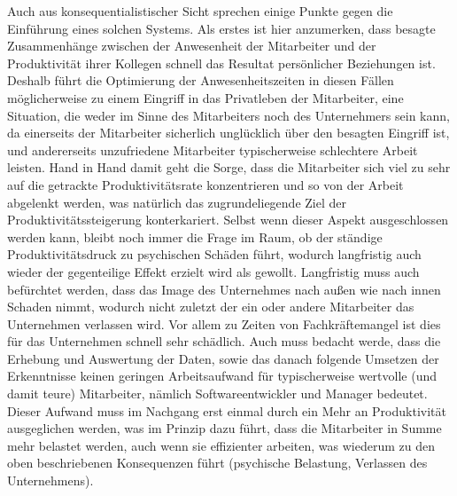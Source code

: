 \documentclass[a4paper,12pt,]{article}
\begin{document}
Auch aus konsequentialistischer Sicht sprechen einige Punkte gegen die Einführung eines solchen Systems. Als erstes ist hier anzumerken, dass besagte Zusammenhänge zwischen der Anwesenheit der Mitarbeiter und der Produktivität ihrer Kollegen schnell das Resultat persönlicher Beziehungen ist. Deshalb führt die Optimierung der Anwesenheitszeiten in diesen Fällen möglicherweise zu einem Eingriff in das Privatleben der Mitarbeiter, eine Situation, die weder im Sinne des Mitarbeiters noch des Unternehmers sein kann, da einerseits der Mitarbeiter sicherlich unglücklich über den besagten Eingriff ist, und andererseits unzufriedene Mitarbeiter typischerweise schlechtere Arbeit leisten. Hand in Hand damit geht die Sorge, dass die Mitarbeiter sich viel zu sehr auf die getrackte Produktivitätsrate konzentrieren und so von der Arbeit abgelenkt werden, was natürlich das zugrundeliegende Ziel der Produktivitätssteigerung konterkariert. Selbst wenn dieser Aspekt ausgeschlossen werden kann, bleibt noch immer die Frage im Raum, ob der ständige Produktivitätsdruck zu psychischen Schäden führt, wodurch langfristig auch wieder der gegenteilige Effekt erzielt wird als gewollt. Langfristig muss auch befürchtet werden, dass das Image des Unternehmes nach außen wie nach innen Schaden nimmt, wodurch nicht zuletzt der ein oder andere Mitarbeiter das Unternehmen verlassen wird. Vor allem zu Zeiten von Fachkräftemangel ist dies für das Unternehmen schnell sehr schädlich. Auch muss bedacht werde, dass die Erhebung und Auswertung der Daten, sowie das danach folgende Umsetzen der Erkenntnisse keinen geringen Arbeitsaufwand für typischerweise wertvolle (und damit teure) Mitarbeiter, nämlich Softwareentwickler und Manager bedeutet. Dieser Aufwand muss im Nachgang erst einmal durch ein Mehr an Produktivität ausgeglichen werden, was im Prinzip dazu führt, dass die Mitarbeiter in Summe mehr belastet werden, auch wenn sie effizienter arbeiten, was wiederum zu den oben beschriebenen Konsequenzen führt (psychische Belastung, Verlassen des Unternehmens).
\end{document}
